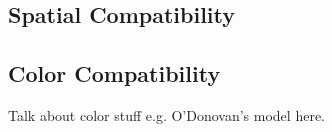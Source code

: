 \subsection{Spatial Compatibility}
\label{sec:spatialCompat}


\subsection{Color Compatibility}
\label{sec:colorCompat}
Talk about color stuff e.g. O'Donovan's model here.